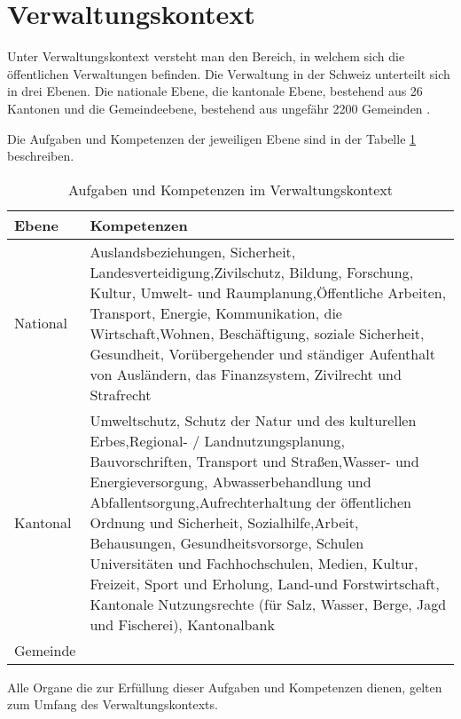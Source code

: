 \section{Verwaltungskontext}

Unter Verwaltungskontext versteht man den Bereich, in welchem sich die öffentlichen Verwaltungen befinden. Die Verwaltung in der Schweiz unterteilt sich in drei Ebenen. Die nationale Ebene, die kantonale Ebene, bestehend aus 26 Kantonen und die Gemeindeebene, bestehend aus ungefähr 2200 Gemeinden \parencite[S. 26-30]{HANDBOEFFVER}.

Die Aufgaben und Kompetenzen der jeweiligen Ebene sind in der Tabelle \ref{tab:aufgabenverwaltungsk} beschreiben. 

\begin{table}[h]
	\centering
\begin{tabular}{|p{4cm}|p{10cm}|}
  \hline
  \textbf{Ebene} & \textbf{Kompetenzen} \\ \hline
   National & Auslandsbeziehungen, Sicherheit, Landesverteidigung,Zivilschutz, Bildung, Forschung, Kultur, Umwelt- und Raumplanung,Öffentliche Arbeiten, Transport, Energie, Kommunikation, die Wirtschaft,Wohnen, Beschäftigung, soziale Sicherheit, Gesundheit, Vorübergehender und ständiger Aufenthalt von Ausländern, das Finanzsystem, Zivilrecht und Strafrecht \\ \hline
   Kantonal & Umweltschutz, Schutz der Natur und des kulturellen Erbes,Regional- / Landnutzungsplanung, Bauvorschriften, Transport und Straßen,Wasser- und Energieversorgung, Abwasserbehandlung und Abfallentsorgung,Aufrechterhaltung der öffentlichen Ordnung und Sicherheit, Sozialhilfe,Arbeit, Behausungen, Gesundheitsvorsorge, Schulen Universitäten und Fachhochschulen, Medien, Kultur, Freizeit, Sport und Erholung, Land-und Forstwirtschaft, Kantonale Nutzungsrechte (für Salz, Wasser, Berge, Jagd und Fischerei), Kantonalbank\\ \hline
   Gemeinde & \\ \hline
  \end{tabular} 
	\caption{Aufgaben und Kompetenzen im Verwaltungskontext \parencite[S. 26-30]{HANDBOEFFVER}}
	\label{tab:aufgabenverwaltungsk}
\end{table}


Alle Organe die zur Erfüllung dieser Aufgaben und Kompetenzen dienen, gelten zum Umfang des Verwaltungskontexts.

